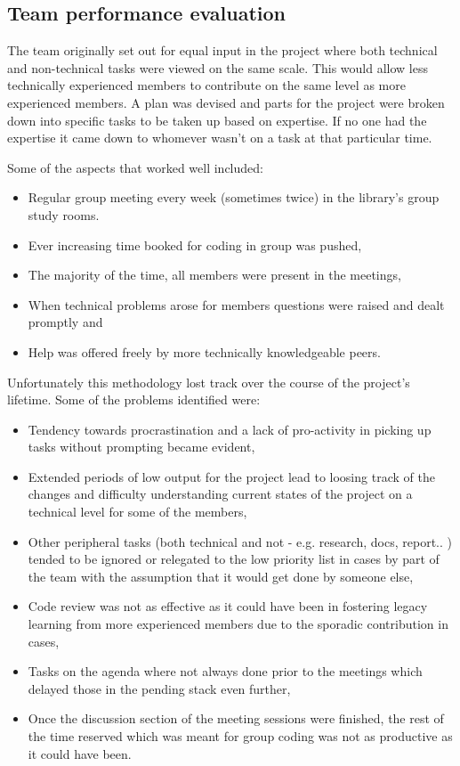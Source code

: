 \subsection{Team performance evaluation}

The team originally set out for equal input in the project where both technical and non-technical tasks were viewed on the same scale. This would allow less technically experienced members to contribute on the same level as more experienced members. A plan was devised and parts for the project were broken down into specific tasks to be taken up based on expertise. If no one had the expertise it came down to whomever wasn't on a task at that particular time.

Some of the aspects that worked well included:
\begin{itemize}
	\item Regular group meeting every week (sometimes twice) in the library's group study rooms.
	\item Ever increasing time booked for coding in group was pushed,
	\item The majority of the time, all members were present in the meetings,
	\item When technical problems arose for members questions were raised and dealt promptly and
	\item Help was offered freely by more technically knowledgeable peers.
\end{itemize}

Unfortunately this methodology lost track over the course of the project's lifetime. Some of the problems identified were:
\begin{itemize}
    \item Tendency towards procrastination and a lack of pro-activity in picking up tasks without prompting became evident,
    \item Extended periods of low output for the project lead to loosing track of the changes and difficulty understanding current states of the project on a technical level for some of the members,
    \item Other peripheral tasks (both technical and not - e.g. research, docs, report.. ) tended to be ignored or relegated to the low priority list in cases by part of the team with the assumption that it would get done by someone else,
    \item Code review was not as effective as it could have been in fostering legacy learning from more experienced members due to the sporadic contribution in cases,
    \item Tasks on the agenda where not always done prior to the meetings which delayed those in the pending stack even further,
    \item Once the discussion section of the meeting sessions were finished, the rest of the time reserved which was meant for group coding was not as productive as it could have been.
\end{itemize}

